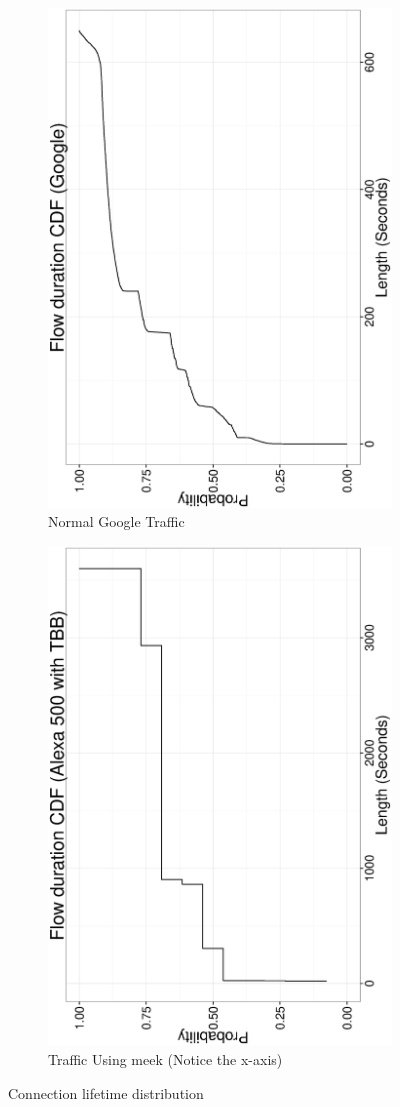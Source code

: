 \documentclass{article}
\begin{document}
\begin{figure}
\centering
\begin{subfigure}[b]{0.5\textwidth}
\includegraphics[height=\textwidth, angle=270]{figs/flowduration-google-cdf.eps}
\caption{Normal Google Traffic}
\label{fig:duration:lbl}
\end{subfigure}%
\begin{subfigure}[b]{0.5\textwidth}
\includegraphics[height=\textwidth, angle=270]{figs/flowduration-tbb-cdf.eps}
\caption{Traffic Using meek (Notice the x-axis)}
\label{fig:duration:meek}
\end{subfigure}

\caption{Connection lifetime distribution}
\label{fig:duration}
\end{figure}
\end{document}
